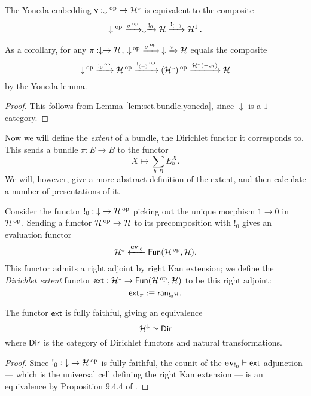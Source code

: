 \begin{lem}\label{lem:type.bundle.yoneda}
The Yoneda embedding $\yo : \downarrow\op \to \Ha^{\downarrow}$ is equivalent to the
composite $$\downarrow\op \xto{\sigma\op} \downarrow \xto{!_{0}} \Ha
\xto{!_{(-)}} \Ha^{\downarrow}.$$

As a corollary, for any $\pi : \downarrow \to \Ha$, $\down\op \xto{\sigma\op}
\down \xto{\pi} \Ha$ equals the composite
$$\down\op \xto{!_0\op} \Ha\op \xto{!_{(-)}\op}
(\Ha^{\downarrow})\op \xto{\Ha^{\downarrow}(-, \pi)} \Ha$$
by the Yoneda lemma.
\end{lem}
\begin{proof}
  This follows from Lemma \ref{lem:set.bundle.yoneda}, since $\downarrow$ is a $1$-category.
\end{proof}

Now we will define the \emph{extent} of a bundle, the Dirichlet functor it
corresponds to. This sends a bundle
$\pi : E \to B$ to the functor
$$X \mapsto \sum_{b : B} E_b^X.$$
We will, however, give a more abstract definition of the extent, and then
calculate a number of presentations of it.

\begin{defn}
Consider the functor $!_0 : \down \to \Ha\op$ picking out the unique morphism $1\to 0$ in $\Ha\op$. Sending a functor $\Ha\op\to\Ha$ to its precomposition with $!_0$ gives an evaluation functor
  $$\Ha^{\down} \xleftarrow{\ev_{!_0}} \Fun(\Ha\op, \Ha).$$
  This functor admits a right adjoint by right Kan extension; we define the
  \emph{Dirichlet extent} functor $\ext : \Ha^{\down} \to \Fun(\Ha\op,
  \Ha)$ to be this right adjoint:
  $$\ext_{\pi} :\equiv \term{ran}_{!_0} \pi.$$
\end{defn}

\begin{prop}
  The functor $\ext$ is fully faithful, giving an equivalence 
  $$\Ha^{\down} \simeq \Dir$$
  where $\Dir$ is the category of Dirichlet functors and natural transformations.
\end{prop}
\begin{proof}
Since $!_0 : \down \to \Ha\op$ is fully faithful, the counit of the
$\ev_{!_0} \vdash \ext$ adjunction --- which is the universal cell defining the
right Kan extension --- is an equivalence by Proposition 9.4.4 of \cite{RV:Elements}. 
\end{proof}


